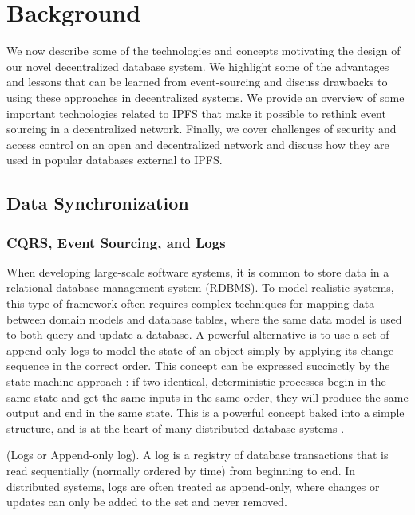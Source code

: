 \documentclass{textile}
\begin{document}
\section{Background}
\label{sec:Background}

We now describe some of the technologies and concepts motivating the design of our novel decentralized database system. We highlight some of the advantages and lessons that can be learned from event-sourcing and discuss drawbacks to using these approaches in decentralized systems. We provide an overview of some important technologies related to IPFS that make it possible to rethink event sourcing in a decentralized network. Finally, we cover challenges of security and access control on an open and decentralized network and discuss how they are used in popular databases external to IPFS. 

\subsection{Data Synchronization}

\subsubsection{CQRS, Event Sourcing, and Logs}

When developing large-scale software systems, it is common to store data in a relational database management system (RDBMS). To model realistic systems, this type of framework often requires complex techniques for mapping data between domain models and database tables, where the same data model is used to both query and update a database. A powerful alternative is to use a set of append only logs to model the state of an object simply by applying its change sequence in the correct order. This concept can be expressed succinctly by the state machine approach \cite{schneiderImplementingFaulttolerantServices1990}: if two identical, deterministic processes begin in the same state and get the same inputs in the same order, they will produce the same output and end in the same state. This is a powerful concept baked into a simple structure, and is at the heart of many distributed database systems \cite{jaykrepsLogWhatEvery2013}.

\begin{definition} (Logs or Append-only log). A log is a registry of database transactions that is read sequentially (normally ordered by time) from beginning to end. In distributed systems, logs are often treated as append-only, where changes or updates can only be added to the set and never removed.  \end{definition} \label{def:Logs}
\end{document}
